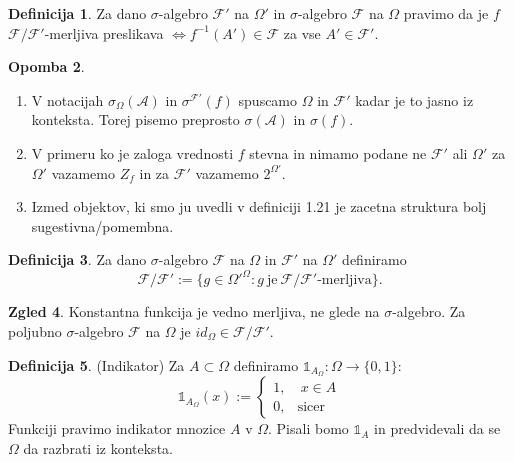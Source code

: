 \documentclass[a4paper,12pt]{article}
\theoremstyle{definition} %
\newtheorem{definicija}{Definicija}[section]
\newtheorem{zgled}[definicija]{Zgled}
\newtheorem{opomba}[definicija]{Opomba}
\theoremstyle{plain} %
\newcommand{\F}{\mathcal{F}}
\newcommand{\A}{\mathcal{A}}
\begin{document}
            \begin{definicija}
                Za dano $\sigma$-algebro $\F'$ na $\Omega'$ in $\sigma$-algebro $\F$ na $\Omega$ pravimo da je $f$ $\F/\F'$-merljiva preslikava $\iff f^{-1}(A')\in \F$ za vse $A' \in \F'$.
            \end{definicija}

            \begin{opomba}
                \begin{enumerate}
                    \item V notacijah $\sigma_\Omega(\A)$ in $\sigma^{\F'}(f)$ spuscamo $\Omega$ in $\F'$ kadar je to jasno iz konteksta. Torej pisemo preprosto $\sigma(\A)$ in $\sigma(f)$.
                    \item V primeru ko je zaloga vrednosti $f$ stevna in nimamo podane ne $\F'$ ali $\Omega'$ za $\Omega'$ vazamemo $Z_f$ in za $\F'$ vazamemo $2^{\Omega'}$.
                    \item Izmed objektov, ki smo ju uvedli v definiciji 1.21 je zacetna struktura bolj sugestivna/pomembna.
                \end{enumerate}
            \end{opomba}

            \begin{definicija}
                Za dano $\sigma$-algebro $\F$ na $\Omega$ in $\F'$ na $\Omega'$ definiramo $$\F/\F':= \{g \in \Omega'^\Omega: g \ \text{je} \ \F/\F'\text{-merljiva}\}.$$
            \end{definicija}

            \begin{zgled}
                Konstantna funkcija je vedno merljiva, ne glede na $\sigma$-algebro. Za poljubno $\sigma$-algebro $\F$ na $\Omega$ je $id_\Omega \in \F/\F'$.
            \end{zgled}

            \begin{definicija}(Indikator)
                Za $A \subset \Omega$ definiramo $\mathds{1}_{A_\Omega}:\Omega\rightarrow\{0, 1\}$:
                $$\mathds{1}_{A_\Omega}(x) := 
                    \begin{cases}
                        1, & \ x \in A \\
                        0, & \text{sicer}
                    \end{cases}$$
                Funkciji pravimo indikator mnozice $A$ v $\Omega$. Pisali bomo $\mathds{1}_A$ in predvidevali da se $\Omega$ da razbrati iz konteksta.
            \end{definicija}
\end{document}
